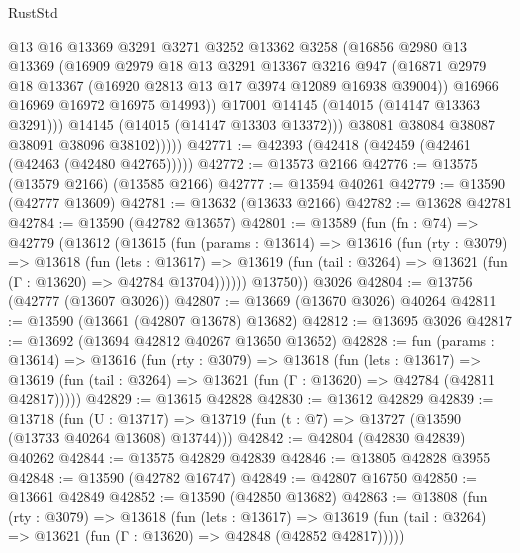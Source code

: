 \begin{lexlean}{RustStd}
\begin{coremodule}
                  @13
                  @16
                  @13369
                  @3291
                  @3271
                  @3252
                  @13362
                  @3258
                  (@16856
                    @2980
                    @13
                    @13369
                    (@16909
                      @2979
                      @18
                      @13
                      @3291
                      @13367
                      @3216
                      @947
                      (@16871 @2979 @18 @13367 (@16920 @2813 @13 @17 @3974 @12089 @16938 @39004))
                      @16966
                      @16969
                      @16972
                      @16975
                      @14993))
                  @17001
                  @14145
                  (@14015 (@14147 @13363 @3291)))
                @14145
                (@14015 (@14147 @13303 @13372)))
              @38081
              @38084
              @38087
              @38091
              @38096
              @38102)))))
@42771 := @42393 (@42418 (@42459 (@42461 (@42463 (@42480 @42765)))))
@42772 := @13573 @2166
@42776 := @13575 (@13579 @2166) (@13585 @2166)
@42777 := @13594 @40261
@42779 := @13590 (@42777 @13609)
@42781 := @13632 (@13633 @2166)
@42782 := @13628 @42781
@42784 := @13590 (@42782 @13657)
@42801 := @13589
    (fun (fn : @74) =>
    @42779
      (@13612
        (@13615
          (fun (params : @13614) =>
          @13616
            (fun (rty : @3079) =>
            @13618
              (fun (lets : @13617) =>
              @13619 (fun (tail : @3264) => @13621 (fun (Γ : @13620) => @42784 @13704))))))
        @13750))
    @3026
@42804 := @13756 (@42777 (@13607 @3026))
@42807 := @13669 (@13670 @3026) @40264
@42811 := @13590 (@13661 (@42807 @13678) @13682)
@42812 := @13695 @3026
@42817 := @13692 (@13694 @42812 @40267 @13650 @13652)
@42828 := fun (params : @13614) =>
  @13616
    (fun (rty : @3079) =>
    @13618
      (fun (lets : @13617) =>
      @13619 (fun (tail : @3264) => @13621 (fun (Γ : @13620) => @42784 (@42811 @42817)))))
@42829 := @13615 @42828
@42830 := @13612 @42829
@42839 := @13718
    (fun (U : @13717) => @13719 (fun (t : @7) => @13727 (@13590 (@13733 @40264 @13608) @13744)))
@42842 := @42804 (@42830 @42839) @40262
@42844 := @13575 @42829 @42839
@42846 := @13805 @42828 @3955
@42848 := @13590 (@42782 @16747)
@42849 := @42807 @16750
@42850 := @13661 @42849
@42852 := @13590 (@42850 @13682)
@42863 := @13808
    (fun (rty : @3079) =>
    @13618
      (fun (lets : @13617) =>
      @13619 (fun (tail : @3264) => @13621 (fun (Γ : @13620) => @42848 (@42852 @42817)))))

\end{coremodule}
\end{lexlean}
